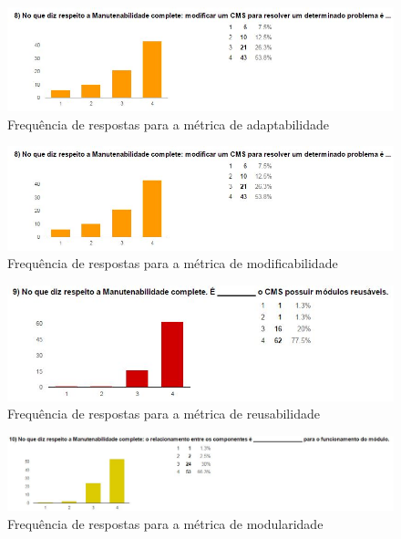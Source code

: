 \begin{figure}[!htb]
\centering
\includegraphics[keepaspectratio=true,scale=0.75]{figuras/Ques_2/q8_fig.jpg}
\caption{Frequência de respostas para a métrica de adaptabilidade}
\label{res_q2-7}
\end{figure}

\begin{figure}[!htb]
\centering
\includegraphics[keepaspectratio=true,scale=0.75]{figuras/Ques_2/q8_fig.jpg}
\caption{Frequência de respostas para a métrica de modificabilidade}
\label{res_q2-8}
\end{figure}


\begin{figure}[!htb]
\centering
\includegraphics[keepaspectratio=true,scale=0.7]{figuras/Ques_2/q9_fig.jpg}
\caption{Frequência de respostas para a métrica de reusabilidade}
\label{res_q2-9}
\end{figure}

\clearpage

\begin{figure}[!htb]
\centering
\includegraphics[keepaspectratio=true,scale=0.6]{figuras/Ques_2/q10_fig.jpg}
\caption{Frequência de respostas para a métrica de modularidade}
\label{res_q2-10}
\end{figure}

